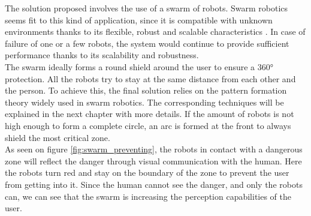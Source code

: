 \documentclass[oneside, a4paper, 12pt]{memoir}
\begin{document}

	
	The solution proposed involves the use of a swarm of robots. Swarm robotics seems fit to this kind of application, since it is compatible with unknown environments thanks to its flexible, robust and scalable characteristics \citep{brambilla2013swarm}. In case of failure of one or a few robots, the system would continue to provide sufficient performance thanks to its scalability and robustness.\\
	
	The swarm ideally forms a round shield around the user to ensure a 360° protection. All the robots try to stay at the same distance from each other and the person. To achieve this, the final solution relies on the pattern formation theory widely used in swarm robotics. The corresponding techniques will be explained in the next chapter with more details. If the amount of robots is not high enough to form a complete circle, an arc is formed at the front to always shield the most critical zone.\\
	
	As seen on figure \ref{fig:swarm_preventing}, the robots in contact with a dangerous zone will reflect the danger through visual communication with the human. Here the robots turn red and stay on the boundary of the zone to prevent the user from getting into it. Since the human cannot see the danger, and only the robots can, we can see that the swarm is increasing the perception capabilities of the user.\\
		
\end{document}
